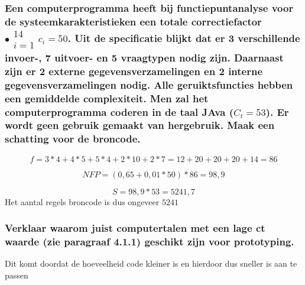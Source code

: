 \documentclass[a4paper,titlepage]{artikel1}
\begin{document}
   \subsubsection[Opdracht 6]{Een computerprogramma heeft bij functiepuntanalyse voor de systeemkarakteristieken een totale correctiefactor $\bullet \begin{array}{c}14\\i=1 \end{array} c_i=50$. Uit de specificatie blijkt dat er 3 verschillende invoer-, 7 uitvoer- en 5 vraagtypen nodig zijn. Daarnaast zijn er 2 externe gegevensverzamelingen en 2 interne gegevensverzamelingen nodig. Alle geruiktsfuncties hebben een gemiddelde complexiteit. Men zal het computerprogramma coderen in de taal JAva ($C_t=53$). Er wordt geen gebruik gemaakt van hergebruik. Maak een schatting voor de broncode.}
   \begin{displaymath}
    f=3*4+4*5+5*4+2*10+2*7=12+20+20+20+14=86
   \end{displaymath}
   
   \begin{displaymath}
    NFP=(0,65+0,01*50)*86=98,9 %
   \end{displaymath}
   
   \begin{displaymath}
    S=98,9*53=5241,7
   \end{displaymath}
   Het aantal regels broncode is dus ongeveer $5241$
   \subsubsection[Opdracht 7]{Verklaar waarom juist computertalen met een lage ct waarde (zie paragraaf 4.1.1) geschikt zijn voor prototyping.}
   Dit komt doordat de hoeveelheid code kleiner is en hierdoor dus sneller is aan te passen
   
\end{document}
